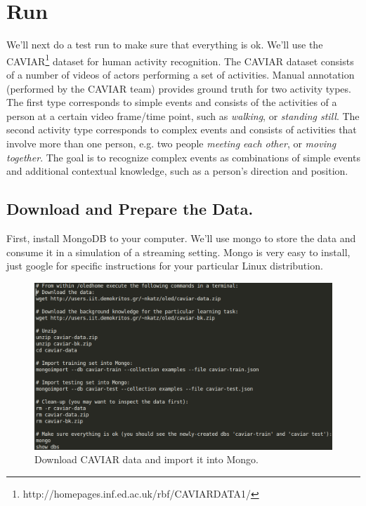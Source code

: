 \documentclass[12pt]{article}
\begin{document}
\section{Run}
We'll next do a test run to make sure that everything is ok. We'll use the CAVIAR\footnote{http://homepages.inf.ed.ac.uk/rbf/CAVIARDATA1/} dataset for human activity recognition. The CAVIAR dataset consists of a number of videos of actors performing a set of activities. Manual annotation (performed by the CAVIAR team) provides ground truth for two activity types. The first type corresponds to simple events and consists of the activities of a person at a certain video frame/time point, such as \emph{walking}, or \emph{standing still}. The second activity type corresponds to complex events and consists of activities that involve more than one person, e.g. two people \emph{meeting each other}, or \emph{moving together}. The goal is to recognize complex events as combinations of simple events and additional contextual knowledge, such as a person's direction and position. 

\subsection{Download and Prepare the Data.}

First, install MongoDB to your computer. We'll use mongo to store the data and consume it in a simulation of a streaming setting. Mongo is very easy to install, just google for specific instructions for your particular Linux distribution.  

\begin{figure}[h]
\centering
\includegraphics[width=1\textwidth]{./figures/download-caviar}
\caption{Download CAVIAR data and import it into Mongo.}%
\label{fig:caviar}
\end{figure}
\end{document}
